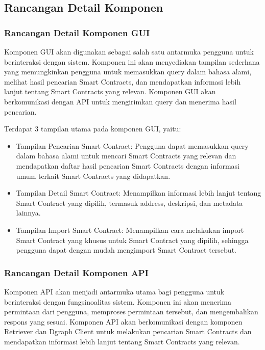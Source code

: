\subsection{Rancangan Detail Komponen}

\subsubsection{Rancangan Detail Komponen GUI}

Komponen GUI akan digunakan sebagai salah satu antarmuka pengguna untuk berinteraksi dengan sistem. Komponen ini akan menyediakan tampilan sederhana yang memungkinkan pengguna untuk memasukkan query dalam bahasa alami, melihat hasil pencarian Smart Contracts, dan mendapatkan informasi lebih lanjut tentang Smart Contracts yang relevan. Komponen GUI akan berkomunikasi dengan API untuk mengirimkan query dan menerima hasil pencarian.

Terdapat 3 tampilan utama pada komponen GUI, yaitu:
\begin{itemize}
    \item Tampilan Pencarian Smart Contract: Pengguna dapat memasukkan query dalam bahasa alami untuk mencari Smart Contracts yang relevan dan mendapatkan daftar hasil pencarian Smart Contracts dengan informasi umum terkait Smart Contracts yang didapatkan.
    \item Tampilan Detail Smart Contract: Menampilkan informasi lebih lanjut tentang Smart Contract yang dipilih, termasuk address, deskripsi, dan metadata lainnya.
    \item Tampilan Import Smart Contract: Menampilkan cara melakukan import Smart Contract yang khusus untuk Smart Contract yang dipilih, sehingga pengguna dapat dengan mudah mengimport Smart Contract tersebut.
\end{itemize}

\subsubsection{Rancangan Detail Komponen API}

Komponen API akan menjadi antarmuka utama bagi pengguna untuk berinteraksi dengan fungsinoalitas sistem. Komponen ini akan menerima permintaan dari pengguna, memproses permintaan tersebut, dan mengembalikan respons yang sesuai. Komponen API akan berkomunikasi dengan komponen Retriever dan Dgraph Client untuk melakukan pencarian Smart Contracts dan mendapatkan informasi lebih lanjut tentang Smart Contracts yang relevan.

